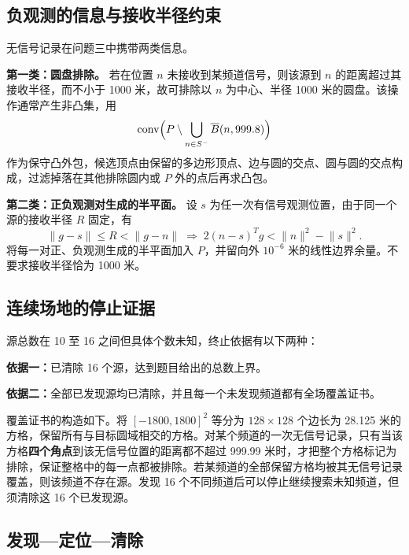 \documentclass[UTF8,a4paper,zihao=-4,fontset=none]{ctexart}
\begin{document}
\subsection{负观测的信息与接收半径约束}

无信号记录在问题三中携带两类信息。

\textbf{第一类：圆盘排除。} 若在位置 $n$ 未接收到某频道信号，则该源到 $n$ 的距离超过其接收半径，而不小于 1000 米，故可排除以 $n$ 为中心、半径 1000 米的圆盘。该操作通常产生非凸集，用
\begin{equation}
  \operatorname{conv}\Bigl(P\setminus\bigcup_{n\in S^-}\overline{B}(n,999.8)\Bigr)
  \label{eq:q3-disk}
\end{equation}
作为保守凸外包，候选顶点由保留的多边形顶点、边与圆的交点、圆与圆的交点构成，过滤掉落在其他排除圆内或 $P$ 外的点后再求凸包。

\textbf{第二类：正负观测对生成的半平面。} 设 $s$ 为任一次有信号观测位置，由于同一个源的接收半径 $R$ 固定，有
\begin{equation}
  \lVert g-s\rVert\le R<\lVert g-n\rVert
  \;\Longrightarrow\;
  2(n-s)^{T}g<\lVert n\rVert^{2}-\lVert s\rVert^{2}.
  \label{eq:q3-halfplane}
\end{equation}
将每一对正、负观测生成的半平面加入 $P$，并留向外 $10^{-6}$ 米的线性边界余量。不要求接收半径恰为 1000 米。

\subsection{连续场地的停止证据}

源总数在 10 至 16 之间但具体个数未知，终止依据有以下两种：

\textbf{依据一：}已清除 16 个源，达到题目给出的总数上界。

\textbf{依据二：}全部已发现源均已清除，并且每一个未发现频道都有全场覆盖证书。

覆盖证书的构造如下。将 $[-1800,1800]^2$ 等分为 $128\times128$ 个边长为 28.125 米的方格，保留所有与目标圆域相交的方格。对某个频道的一次无信号记录，只有当该方格\textbf{四个角点}到该无信号位置的距离都不超过 999.99 米时，才把整个方格标记为排除，保证整格中的每一点都被排除。若某频道的全部保留方格均被其无信号记录覆盖，则该频道不存在源。发现 16 个不同频道后可以停止继续搜索未知频道，但须清除这 16 个已发现源。

\subsection{发现—定位—清除}
\end{document}

